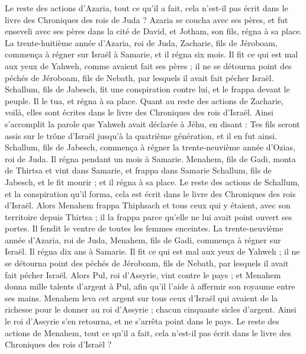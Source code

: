 \begin{multicols}{2}
Le reste des actions d’Azaria, tout ce qu’il a fait, cela n’est-il pas écrit dans le livre des Chroniques des rois de Juda ?
Azaria se coucha avec ses pères, et fut enseveli avec ses pères dans la cité de David, et Jotham, son fils, régna à sa place.
La trente-huitième année d’Azaria, roi de Juda, Zacharie, fils de Jéroboam, commença à régner sur Israël à Samarie, et il régna six mois.
Il fit ce qui est mal aux yeux de Yahweh, comme avaient fait ses pères ; il ne se détourna point des péchés de Jéroboam, fils de Nebath, par lesquels il avait fait pécher Israël.
Schallum, fils de Jabesch, fit une conspiration contre lui, et le frappa devant le peuple. Il le tua, et régna à sa place.
Quant au reste des actions de Zacharie, voilà, elles sont écrites dans le livre des Chroniques des rois d’Israël.
Ainsi s’accomplit la parole que Yahweh avait déclarée à Jéhu, en disant : Tes fils seront assis sur le trône d’Israël jusqu’à la quatrième génération, et il en fut ainsi.
Schallum, fils de Jabesch, commença à régner la trente-neuvième année d’Ozias, roi de Juda. Il régna pendant un mois à Samarie.
Menahem, fils de Gadi, monta de Thirtsa et vint dans Samarie, et frappa dans Samarie Schallum, fils de Jabesch, et le fit mourir ; et il régna à sa place.
Le reste des actions de Schallum, et la conspiration qu’il forma, cela est écrit dans le livre des Chroniques des rois d’Israël.
Alors Menahem frappa Thiphsach et tous ceux qui y étaient, avec son territoire depuis Thirtsa ; il la frappa parce qu’elle ne lui avait point ouvert ses portes. Il fendit le ventre de toutes les femmes enceintes.
La trente-neuvième année d’Azaria, roi de Juda, Menahem, fils de Gadi, commença à régner sur Israël. Il régna dix ans à Samarie.
Il fit ce qui est mal aux yeux de Yahweh ; il ne se détourna point des péchés de Jéroboam, fils de Nebath, par lesquels il avait fait pécher Israël.
Alors Pul, roi d’Assyrie, vint contre le pays ; et Menahem donna mille talents d’argent à Pul, afin qu’il l’aide à affermir son royaume entre ses mains.
Menahem leva cet argent sur tous ceux d’Israël qui avaient de la richesse pour le donner au roi d’Assyrie ; chacun cinquante sicles d’argent. Ainsi le roi d’Assyrie s’en retourna, et ne s’arrêta point dans le pays.
Le reste des actions de Menahem, tout ce qu’il a fait, cela n’est-il pas écrit dans le livre des Chroniques des rois d’Israël ?

\end{multicols}
